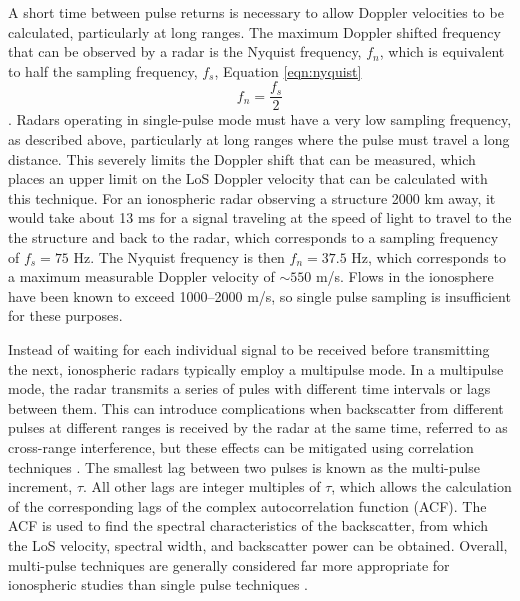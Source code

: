 A short time between pulse returns is necessary to allow Doppler velocities to be calculated, particularly at long ranges.  The maximum Doppler shifted frequency that can be observed by a radar is the Nyquist frequency, \(f_n\), which is equivalent to half the sampling frequency, \(f_s\), Equation \ref{eqn:nyquist}
\begin{equation}	
	\label{eqn:nyquist}
	f_n = \frac{f_s}{2}
\end{equation}.
Radars operating in single-pulse mode must have a very low sampling frequency, as described above, particularly at long ranges where the pulse must travel a long distance.  This severely limits the Doppler shift that can be measured, which places an upper limit on the LoS Doppler velocity that can be calculated with this technique.  For an ionospheric radar observing a structure 2000 km away, it would take about 13 ms for a signal traveling at the speed of light to travel to the the structure and back to the radar, which corresponds to a sampling frequency of \(f_s = 75\) Hz.  The Nyquist frequency is then \(f_n = 37.5\) Hz, which corresponds to a maximum measurable Doppler velocity of \(\sim550\) m/s.  Flows in the ionosphere have been known to exceed 1000--2000 m/s, so single pulse sampling is insufficient for these purposes.

Instead of waiting for each individual signal to be received before transmitting the next, ionospheric radars typically employ a multipulse mode. In a multipulse mode, the radar transmits a series of pules with different time intervals or lags between them.  This can introduce complications when backscatter from different pulses at different ranges is received by the radar at the same time, referred to as cross-range interference, but these effects can be mitigated using correlation techniques \citep{Farley1972}.  The smallest lag between two pulses is known as the multi-pulse increment, \(\tau\).  All other lags are integer multiples of \(\tau\), which allows the calculation of the corresponding lags of the complex autocorrelation function (ACF).  The ACF is used to find the spectral characteristics of the backscatter, from which the LoS velocity, spectral width, and backscatter power can be obtained.  Overall, multi-pulse techniques are generally considered far more appropriate for ionospheric studies than single pulse techniques \citep{Farley1972,Greenwald1983,Greenwald1985,Barthes1998,Ponomarenko2006}.

